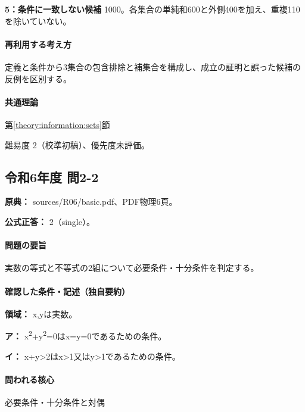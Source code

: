 \noindent\textbf{5：条件に一致しない候補} 1000。各集合の単純和600と外側400を加え、重複110を除いていない。\par

\paragraph{再利用する考え方} 定義と条件から3集合の包含排除と補集合を構成し、成立の証明と誤った候補の反例を区別する。

\paragraph{共通理論} \hyperref[theory:information:sets]{第\ref*{theory:information:sets}節}

\par 難易度 2（校準初稿）、優先度未評価。

\subsection{令和6年度 問2-2}
\label{q:r06-reg-basic-2-2}

\noindent\textbf{原典：} sources/R06/basic.pdf、PDF物理6頁。

\textbf{公式正答：} 2（single）。

\paragraph{問題の要旨} 実数の等式と不等式の2組について必要条件・十分条件を判定する。

\paragraph{確認した条件・記述（独自要約）}\mbox{}\par

\noindent\textbf{領域：} x,yは実数。\par

\noindent\textbf{ア：} x\textsuperscript{2}+y\textsuperscript{2}=0はx=\allowbreak{}y=\allowbreak{}0であるための条件。\par

\noindent\textbf{イ：} x+y>2はx>1又はy>1であるための条件。\par

\paragraph{問われる核心} 必要条件・十分条件と対偶

